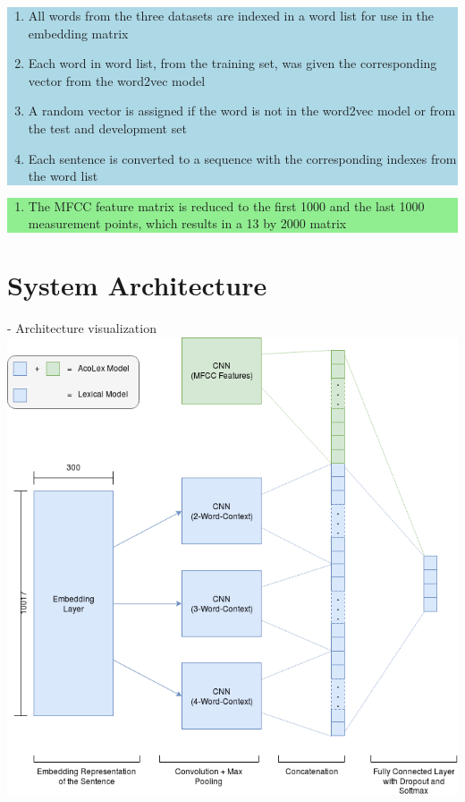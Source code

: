 \documentclass[a0,landscape]{a0poster}
\begin{document}
\begin{multicols}{3}
\colorbox{lightblue}{
	\parbox{1000pt}{
		\begin{enumerate}
			\item All words from the three datasets are indexed in a word list for use in the embedding matrix
			\item Each word in word list, from the training set, was given the corresponding vector from the word2vec model
			\item A random vector is assigned if the word is not in the word2vec model or from the test and development set
			\item Each sentence is converted to a sequence with the corresponding indexes from the word list
		\end{enumerate}
}}
\colorbox{lightgreen}{
	\parbox{1000pt}{
		\begin{enumerate}
			\item The MFCC feature matrix is reduced to the first 1000 and the last 1000 measurement points, which results in a 13 by 2000 matrix  
		\end{enumerate}
	}}


\section*{System Architecture}
- Architecture visualization\\
\includegraphics[width=\linewidth]{Bilder/CNN_Diagram.png}


\end{multicols}
\end{document}
